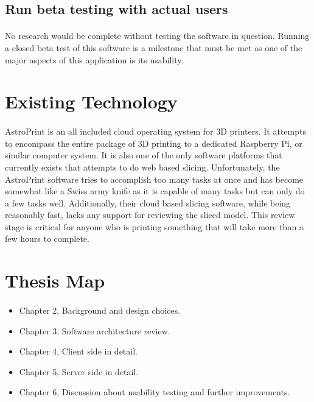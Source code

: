 \subsection{Run beta testing with actual users}
\paragraph{}
No research would be complete without testing the software in question.
Running a closed beta test of this software is a milestone that must be met as one of the major aspects of this application is its usability.

\section{Existing Technology}
\paragraph{}
AstroPrint is an all included cloud operating system for 3D printers.
It attempts to encompass the entire package of 3D printing to a dedicated Raspberry Pi, or similar computer system.
It is also one of the only software platforms that currently exists that attempts to do web based slicing.
Unfortunately, the AstroPrint software tries to accomplish too many tasks at once and has become somewhat like a Swiss army knife as it is capable of many tasks but can only do a few tasks well.
Additionally, their cloud based slicing software, while being reasonably fast, lacks any support for reviewing the sliced model.
This review stage is critical for anyone who is printing something that will take more than a few hours to complete.

\section{Thesis Map}
\paragraph{}
\begin{itemize}
\item Chapter 2, Background and design choices.
\item Chapter 3, Software architecture review.
\item Chapter 4, Client side in detail. 
\item Chapter 5, Server side in detail.
\item Chapter 6, Discussion about usability testing and further improvements.
\end{itemize}

